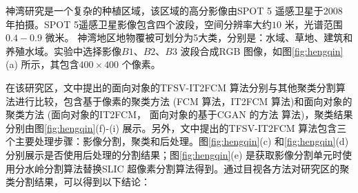 \begin{table}[!h]
    \centering
    \caption{各优化方法影像分类精度表}\label{tab:gaijin_cgan}
\end{table}


神湾研究是一个复杂的种植区域，该区域的高分影像由SPOT 5 遥感卫星于2008 年拍摄。SPOT 5遥感卫星影像包含四个波段，空间分辨率大约$10$ 米，光谱范围$0.4-0.9$ 微米。 神湾地区地物覆被可划分为5大类，分别是：水域、草地、建筑和养殖水域。实验中选择影像$B1$、$B2$、$B3$ 波段合成RGB 图像，如图\ref{fig:hengqin}(a) 所示，其包含$400 \times 400$ 个像素。

在该研究区，文中提出的面向对象的TFSV-IT2FCM 算法分别与其他聚类分割算法进行比较，包含基于像素的聚类方法 (FCM 算法，IT2FCM 算法)和面向对象的聚类方法 (面向对象的IT2FCM， 面向对象的基于CGAN 的方法 算法)，聚类结果分别由图\ref{fig:hengqin}(f)-(i) 展示。另外，文中提出的TFSV-IT2FCM 算法包含三个主要处理步骤：影像分割，聚类和后处理。图\ref{fig:hengqin}(c) 和\ref{fig:hengqin}(d) 分别展示是否使用后处理的分割结果；图\ref{fig:hengqin}(e) 是获取影像分割单元时使用分水岭分割算法替换SLIC 超像素分割算法得到。通过目视各方法对研究区的聚类分割结果，可以得到以下结论：

